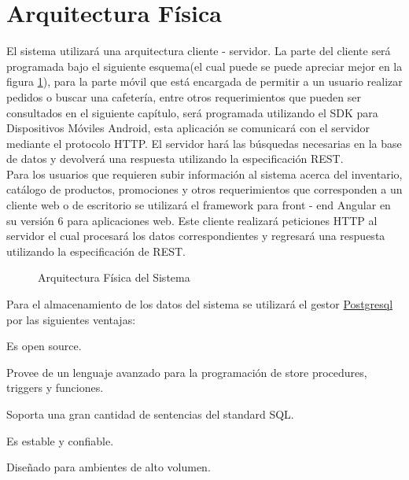 
\section{Arquitectura Física}
El sistema utilizará una arquitectura cliente - servidor. La parte del cliente será programada bajo el siguiente esquema(el cual puede se puede apreciar mejor en la figura \ref{fig:arqFisica}), para la parte móvil que está encargada de permitir a un usuario realizar pedidos o buscar una cafetería, entre otros requerimientos que pueden ser consultados en el siguiente capítulo, será programada utilizando el SDK para Dispositivos Móviles Android, esta aplicación se comunicará con el servidor mediante el protocolo HTTP. El servidor hará las búsquedas necesarias en la base de datos y devolverá una respuesta utilizando la especificación REST.\\

Para los usuarios que requieren subir información al sistema acerca del inventario, catálogo de productos, promociones y otros requerimientos que corresponden a un cliente web o de escritorio se utilizará el framework para front - end Angular en su versión 6 para aplicaciones web. Este cliente realizará peticiones HTTP al servidor el cual procesará los datos correspondientes y regresará una respuesta utilizando la especificación de REST.\\

\begin{figure}[hbtp!]
	\begin{center}
		\caption{Arquitectura Física del Sistema}
		\label{fig:arqFisica}
	\end{center}
\end{figure}

Para el almacenamiento de los datos del sistema se utilizará el gestor \href{https://www.postgresql.org}{Postgresql} por las siguientes ventajas:
	\begin{Citemize}
		\item Es open source.
		\item Provee de un lenguaje avanzado para la programación de store procedures, triggers y funciones.
		\item Soporta una gran cantidad de sentencias del standard SQL.
		\item Es estable y confiable.
		\item Diseñado para ambientes de alto volumen. 
	\end{Citemize}

